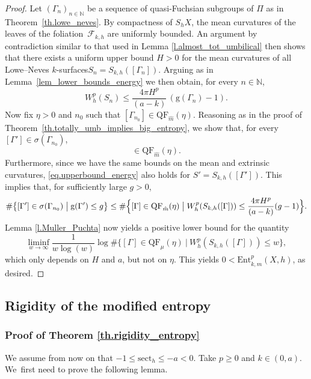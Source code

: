 \documentclass[11pt]{article}
\newcommand{\Subsection}{\subsection}
\newcommand{\ksurfaces}{$k$\nobreakdash-surfaces\xspace}
\theoremstyle{plain}
\theoremstyle{definition}
\newcommand{\N}{{\mathbb N}}
\newcommand{\cF}{{\mathcal F}}
\newcommand{\sect}{\mathrm{sect}}
\newcommand{\Ent}{\mathrm{Ent}}
\newcommand{\QF}{\mathrm{QF}}
\begin{document}
\begin{proof} Let $(\Gamma_n)_{n\in\mathbb{N}}$ be a sequence of quasi-Fuchsian subgroups of $\Pi$ as in Theorem~\ref{th.lowe_neves}. By compactness of $S_hX$, the mean curvatures of the leaves of the foliation~$\cF_{k,h}$ are uniformly bounded. An argument by contradiction similar to that used in Lemma \ref{l.almost_tot_umbilical} then shows that there exists a uniform upper bound $H>0$ for the mean curvatures of all Lowe--Neves \ksurfaces $S_n=S_{k,h}([\Gamma_n])$. Arguing as in Lemma~\ref{lem_lower_bounds_energy} we then obtain, for every $n\in\N$,
\begin{equation}\label{eq.upperbound_energy}
W^{p}_{h}(S_n)\leq \frac{4\pi H^p}{(a-k)}\,(\mathrm{g}(\Gamma_n)-1).
\end{equation}
Now fix $\eta>0$ and $n_0$ such that $[\Gamma_{n_0}]\in\QF_{\hat m}(\eta)$. Reasoning as in the proof of Theo\-rem~\ref{th.totally_umb_implies_big_entropy}, we show that, for every $[\Gamma']\in\sigma(\Gamma_{n_0})$,
\begin{equation*}
[\Gamma']\in\QF_{\hat m}(\eta).
\end{equation*}
Furthermore, since we have the same bounds on the mean and extrinsic curvatures, \eqref{eq.upperbound_energy} also holds for $S'=S_{k,h}([\Gamma'])$. This implies that, for sufficiently large $g>0$,
\begin{equation*}
\#\bigl\{[\Gamma']\in\sigma(\Gamma_{n_0})\bigm| \mathrm{g}(\Gamma')\leq g\bigr\}\leq\#\Bigl\{[\Gamma]\in\QF_{\hat m}(\eta)\bigm| W^{p}_{h}(S_{k,h}([\Gamma]))\leq \frac{4\pi H^p}{(a-k)}(g-1)\Bigr\}.
\end{equation*}
Lemma \ref{l.Muller_Puchta} now yields a positive lower bound for the quantity
\begin{equation*}
\liminf_{w\to\infty}\frac{1}{w\log(w)}\log\#\bigl\{[\Gamma]\in\QF_\mu(\eta)\ \big|\ W^{p}_{h}(S_{k,h}([\Gamma]))\leq w\bigr\},
\end{equation*}
which only depends on $H$ and $a$, but not on $\eta$. This yields $0<\Ent^p_{k,\hat m}(X,h)$, as desired.
\end{proof}

\Subsection{Rigidity of the modified entropy}

\subsubsection{Proof of Theorem \ref{th.rigidity_entropy}} We assume from now on that $-1\leq\sect_h\leq -a <0$. Take $p\geq 0$ and $k\in(0,a)$. We~first need to prove the following lemma.
\end{document}

